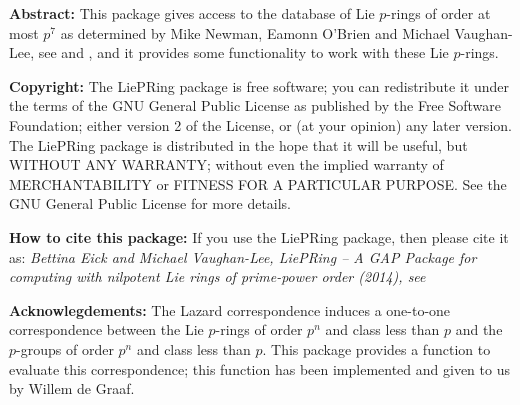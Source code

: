 

{\bf Abstract:}
This package gives access to the database of Lie $p$-rings of order at most 
$p^7$ as determined by Mike Newman, Eamonn O'Brien and Michael Vaughan-Lee, 
see \cite{NOV04} and \cite{OVL05}, and it provides some functionality to 
work with these Lie $p$-rings.
\bigskip

{\bf Copyright:}
The LiePRing package is free software; you can redistribute it under the 
terms of the GNU General Public License as published by the Free Software 
Foundation; either version 2 of the License, or (at your opinion) any 
later version. The LiePRing package is distributed in the hope that it will 
be useful, but WITHOUT ANY WARRANTY; without even the implied warranty of
MERCHANTABILITY or FITNESS FOR A PARTICULAR PURPOSE. See the GNU General 
Public License for more details.
\bigskip

{\bf How to cite this package:}
If you use the LiePRing package, then please cite it as:
{\it Bettina Eick and Michael Vaughan-Lee, LiePRing -- A GAP Package for
computing with nilpotent Lie rings of prime-power order (2014), see
}
\bigskip

{\bf Acknowlegdements:}
The Lazard correspondence induces a one-to-one correspondence between the
Lie $p$-rings of order $p^n$ and class less than $p$ and the $p$-groups of 
order $p^n$ and class less than $p$. This package provides a function to 
evaluate this correspondence; this function has been implemented and given
to us by Willem de Graaf. 


